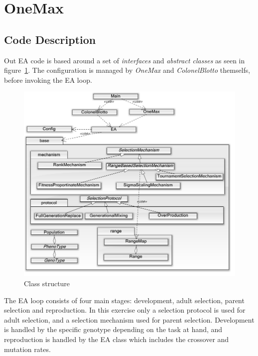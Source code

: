 \section{OneMax}
\subsection{Code Description}
	Out EA code is based around a set of \textit{interfaces} and \textit{abstract classes} as seen in figure~\ref{fig:classes}.
	The configuration is managed by \textit{OneMax} and \textit{ColonelBlotto} themselfs, before invoking the EA loop.
	\begin{figure}[H]
		\includegraphics[width=\columnwidth]{images/ClassStructure.png}
		\caption{Class structure}
		\label{fig:classes}
	\end{figure}
	The EA loop consists of four main stages: development, adult selection, parent selection and reproduction. In this exercise only a selection protocol is used for adult selection, and a selection mechanism used for parent selection. Development is handled by the specific genotype depending on the task at hand, and reproduction is handled by the EA class which includes the crossover and mutation rates. 
	

